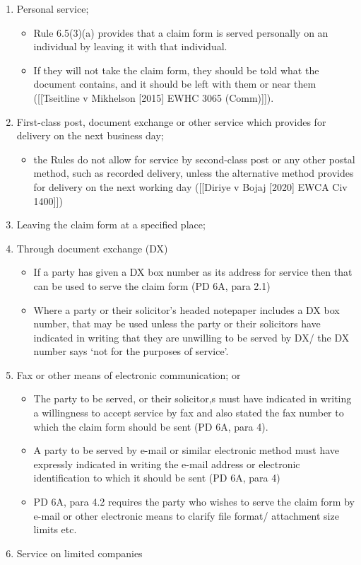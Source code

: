 \documentclass[
]{article}
\providecommand{\tightlist}{%
  \setlength{\itemsep}{0pt}\setlength{\parskip}{0pt}}
\begin{document}
\begin{enumerate}
\def\labelenumi{\arabic{enumi}.}
\tightlist
\item
  Personal service;

  \begin{itemize}
  \tightlist
  \item
    Rule 6.5(3)(a) provides that a claim form is served personally on an
    individual by leaving it with that individual.
  \item
    If they will not take the claim form, they should be told what the
    document contains, and it should be left with them or near them
    ({[}{[}Tseitline v Mikhelson {[}2015{]} EWHC 3065 (Comm){]}{]}).
  \end{itemize}
\item
  First-class post, document exchange or other service which provides
  for delivery on the next business day;

  \begin{itemize}
  \tightlist
  \item
    the Rules do not allow for service by second-class post or any other
    postal method, such as recorded delivery, unless the alternative
    method provides for delivery on the next working day ({[}{[}Diriye v
    Bojaj {[}2020{]} EWCA Civ 1400{]}{]})
  \end{itemize}
\item
  Leaving the claim form at a specified place;
\item
  Through document exchange (DX)

  \begin{itemize}
  \tightlist
  \item
    If a party has given a DX box number as its address for service then
    that can be used to serve the claim form (PD 6A, para 2.1)
  \item
    Where a party or their solicitor's headed notepaper includes a DX
    box number, that may be used unless the party or their solicitors
    have indicated in writing that they are unwilling to be served by
    DX/ the DX number says `not for the purposes of service'.
  \end{itemize}
\item
  Fax or other means of electronic communication; or

  \begin{itemize}
  \tightlist
  \item
    The party to be served, or their solicitor,s must have indicated in
    writing a willingness to accept service by fax and also stated the
    fax number to which the claim form should be sent (PD 6A, para 4).
  \item
    A party to be served by e-mail or similar electronic method must
    have expressly indicated in writing the e-mail address or electronic
    identification to which it should be sent (PD 6A, para 4)
  \item
    PD 6A, para 4.2 requires the party who wishes to serve the claim
    form by e-mail or other electronic means to clarify file format/
    attachment size limits etc.
  \end{itemize}
\item
  Service on limited companies


\end{enumerate}
\end{document}
